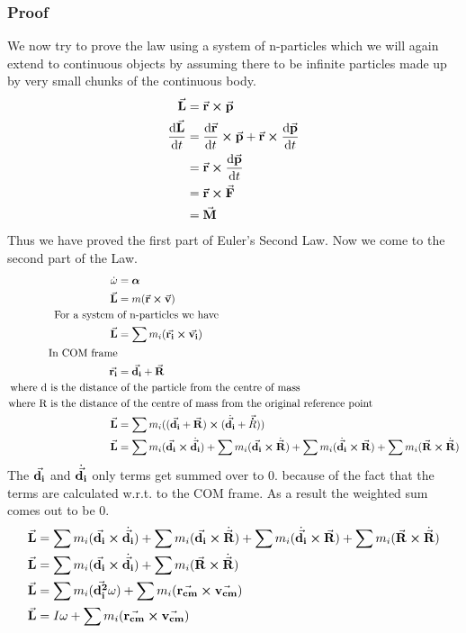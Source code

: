 \documentclass{article}
\begin{document}
\subsubsection{Proof}
We now try to prove the law using a system of n-particles which we will again extend to continuous objects by assuming there to be infinite particles made up by very small chunks of the continuous body.\\
\begin{align*}
    \va{L} &= \va{r}\cp\va{p}\\
    \dv{\va{L}}{t} &=\dv{\va{r}}{t}\cp\va{p} + \va{r}\cp\dv{\va{p}}{t}\\
    &= \va{r}\cp\dv{\va{p}}{t}\\
    &= \va{r}\cp\va{F}\\
    &= \va{M}\\
\end{align*}
Thus we have proved the first part of Euler's Second Law. Now we come to the second part of the Law.
\begin{align*}
    \Dot{\omega} &= \vb*{\alpha}\\
    \va{L} &= m(\va{r}\cp\va{v})\\
    \text{For a system }& \text{of n-particles we have}\\
    \va{L} &= \sum m_i(\va{r_i}\cp\va{v_i})\\
    \text{In COM frame}&\\
    \va{r_i} &= \va{d_i } + \va{R}\\
    \text{where d is the distance}&\text{ of the particle from the centre of mass}\\
    \text{where R is the distance}&\text{ of the centre of mass from the original reference point}\\
    \va{L} &= \sum m_i((\va{d_i }+\va{R})\cp(\Dot{\va{d_i}}+\va{\Dot{R}}))\\
    \va{L} &= \sum m_i(\va{d_i }\cp\Dot{\va{d_i}}) + \sum m_i(\va{d_i }\cp\Dot{\va{R}})+\sum m_i(\Dot{\va{d_i }}\cp\va{R}) + \sum m_i(\va{R} \cp\Dot{\va{R}})\\
\end{align*}
The $\va{d_i}$ and  $\Dot{\va{d_i }}$ only terms get summed over to 0. because of the fact that the terms are calculated w.r.t. to the COM frame. As a result the weighted sum comes out to be 0.
\begin{align*}
     \va{L} &= \sum m_i(\va{d_i }\cp\Dot{\va{d_i}}) + \sum m_i(\va{d_i }\cp\Dot{\va{R}})+\sum m_i(\Dot{\va{d_i }}\cp\va{R}) + \sum m_i(\va{R} \cp\Dot{\va{R}})\\
      \va{L} &= \sum m_i(\va{d_i }\cp\Dot{\va{d_i}}) +\sum m_i(\va{R} \cp\Dot{\va{R}})\\
      \va{L} &= \sum m_i(\va{d_i^2}\omega) +\sum m_i(\va{r_{cm}} \cp\va{v_{cm}})\\
      \va{L} &= I\omega +\sum m_i(\va{r_{cm}} \cp\va{v_{cm}})
\end{align*}
\end{document}
